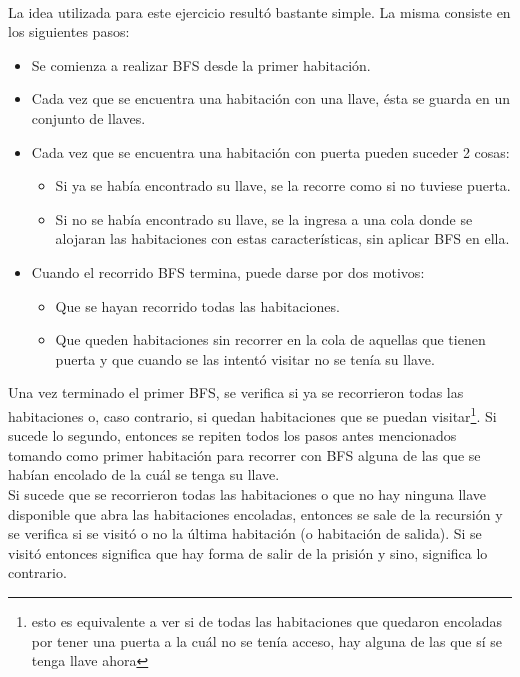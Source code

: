\paragraph{}
La idea utilizada para este ejercicio resultó bastante simple. La misma consiste en los siguientes pasos:
\begin{itemize}
	\item Se comienza a realizar BFS desde la primer habitación.
	\item Cada vez que se encuentra una habitación con una llave, ésta se guarda en un conjunto de llaves.
	\item Cada vez que se encuentra una habitación con puerta pueden suceder 2 cosas:
	\begin{itemize}
		\item Si ya se había encontrado su llave, se la recorre como si no tuviese puerta.
		\item Si no se había encontrado su llave, se la ingresa a una cola donde se alojaran las habitaciones con estas características, sin aplicar BFS en ella.
	\end{itemize}
	\item Cuando el recorrido BFS termina, puede darse por dos motivos:
	\begin{itemize}
		\item Que se hayan recorrido todas las habitaciones.
		\item Que queden habitaciones sin recorrer en la cola de aquellas que tienen puerta y que cuando se las intentó visitar no se tenía su llave.
	\end{itemize}
\end{itemize}

Una vez terminado el primer BFS, se verifica si ya se recorrieron todas las habitaciones o, caso contrario, si quedan habitaciones que se puedan visitar\footnote{esto es equivalente a ver si de todas las habitaciones que quedaron encoladas por tener una puerta a la cuál no se tenía acceso, hay alguna de las que sí se tenga llave ahora}. Si sucede lo segundo, entonces se repiten todos los pasos antes mencionados tomando como primer habitación para recorrer con BFS alguna de las que se habían encolado de la cuál se tenga su llave.\\
Si sucede que se recorrieron todas las habitaciones o que no hay ninguna llave disponible que abra las habitaciones encoladas, entonces se sale de la recursión y se verifica si se visitó o no la última habitación (o habitación de salida). Si se visitó entonces significa que hay forma de salir de la prisión y sino, significa lo contrario.

